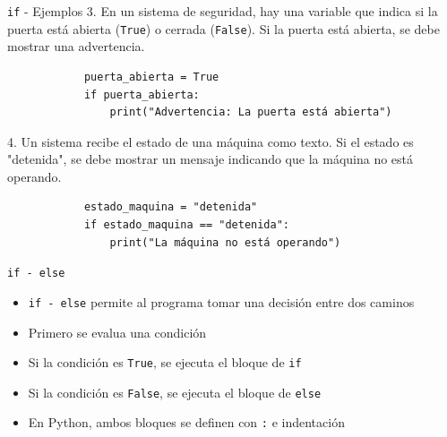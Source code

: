 \documentclass{beamer}
\begin{document}
    \begin{frame}[fragile,t]{\texttt{if} - Ejemplos}
        3. En un sistema de seguridad, hay una variable que indica si la puerta está 
        abierta (\texttt{True}) o cerrada (\texttt{False}). 
        Si la puerta está abierta, se debe mostrar una advertencia.
        \begin{verbatim}
            puerta_abierta = True
            if puerta_abierta:
                print("Advertencia: La puerta está abierta")
        \end{verbatim}
        4. Un sistema recibe el estado de una máquina como texto. Si el estado es "detenida", 
        se debe mostrar un mensaje indicando que la máquina no está operando.
        \begin{verbatim}
            estado_maquina = "detenida"
            if estado_maquina == "detenida":
                print("La máquina no está operando")
        \end{verbatim}
    \end{frame}


    \begin{frame}[fragile,t]{\texttt{if - else}}
        \begin{itemize}
            \item \texttt{if - else} permite al programa tomar una decisión entre dos caminos
            \item Primero se evalua una condición
            \item Si la condición es \texttt{True}, se ejecuta el bloque de \texttt{if}
            \item Si la condición es \texttt{False}, se ejecuta el bloque de \texttt{else}
            \item En Python, ambos bloques se definen con \texttt{:} e indentación
        \end{itemize}
    \end{frame}
\end{document}

